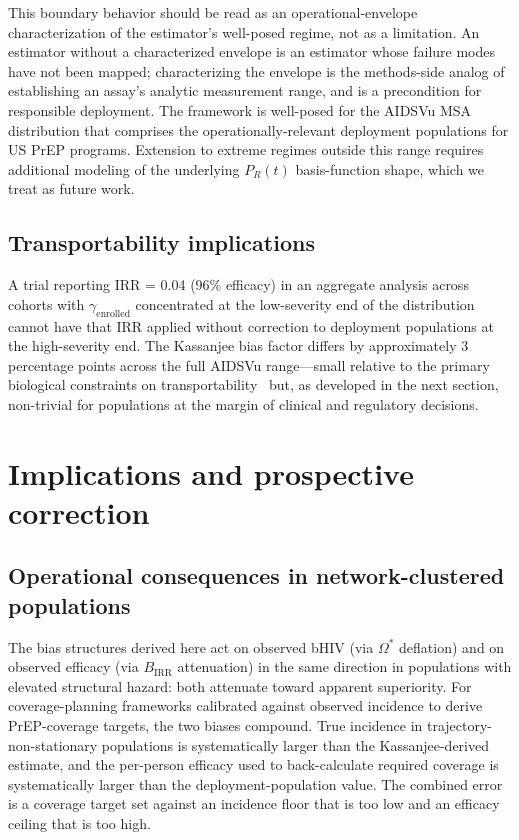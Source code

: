 \documentclass[11pt]{article}
\begin{document}
This boundary behavior should be read as an operational-envelope characterization of the estimator's well-posed regime, not as a limitation. An estimator without a characterized envelope is an estimator whose failure modes have not been mapped; characterizing the envelope is the methods-side analog of establishing an assay's analytic measurement range, and is a precondition for responsible deployment. The framework is well-posed for the AIDSVu MSA distribution that comprises the operationally-relevant deployment populations for US PrEP programs. Extension to extreme regimes outside this range requires additional modeling of the underlying $P_R(t)$ basis-function shape, which we treat as future work.

\subsection{Transportability implications}

A trial reporting IRR = 0.04 (96\% efficacy) in an aggregate analysis across cohorts with $\gamma_{\mathrm{enrolled}}$ concentrated at the low-severity end of the distribution cannot have that IRR applied without correction to deployment populations at the high-severity end. The Kassanjee bias factor differs by approximately 3 percentage points across the full AIDSVu range---small relative to the primary biological constraints on transportability~\cite{demidont2026fw} but, as developed in the next section, non-trivial for populations at the margin of clinical and regulatory decisions.

\section{Implications and prospective correction}

\subsection{Operational consequences in network-clustered populations}

The bias structures derived here act on observed bHIV (via $\Omega^*$ deflation) and on observed efficacy (via $B_{\mathrm{IRR}}$ attenuation) in the same direction in populations with elevated structural hazard: both attenuate toward apparent superiority. For coverage-planning frameworks calibrated against observed incidence to derive PrEP-coverage targets, the two biases compound. True incidence in trajectory-non-stationary populations is systematically larger than the Kassanjee-derived estimate, and the per-person efficacy used to back-calculate required coverage is systematically larger than the deployment-population value. The combined error is a coverage target set against an incidence floor that is too low and an efficacy ceiling that is too high.
\end{document}
